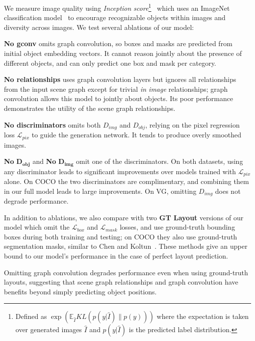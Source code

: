 \documentclass[10pt,twocolumn,letterpaper]{article}
\newcommand{\LL}{\mathcal{L}}
\begin{document}
We measure image quality using \emph{Inception score}\footnote{Defined as $\exp(\mathbb{E}_{\hat I} KL(p(y|\hat I)\|p(y)))$ where the expectation is taken over generated images $\hat I$ and $p(y|\hat I)$ is the predicted label distribution.}~\cite{salimans2016improved}
which uses an ImageNet classification model~\cite{russakovsky2015imagenet,szegedy2015going}
to encourage recognizable objects within images and diversity across images.
We test several ablations of our model:

\textbf{No gconv} omits graph convolution, so boxes and
masks are predicted from initial object embedding vectors.
It cannot reason jointly about the presence of different objects, and can only predict one box and mask per category.

\textbf{No relationships} uses graph convolution layers but ignores all
relationships from the input scene graph except for trivial \emph{in image}
relationships; graph convolution allows this model to jointly about
objects. Its poor performance demonstrates the utility of the scene graph relationships.

\textbf{No discriminators} omits both $D_{img}$ and $D_{obj}$, relying on the
pixel regression loss $\LL_{pix}$ to guide the generation network.
It tends to produce overly smoothed images.

\textbf{No} $\mathbf{D_{obj}}$ and \textbf{No} $\mathbf{D_{img}}$ omit one of
the discriminators. On both datasets, using any discriminator leads
to significant improvements over models trained with $\LL_{pix}$ alone.
On COCO the two discriminators are complimentary, and combining
them in our full model leads to large improvements.
On VG, omitting $D_{img}$ does not degrade performance.

In addition to ablations, we also compare with two \textbf{GT Layout}
versions of our model which omit the $\LL_{box}$ and $\LL_{mask}$ losses, and
use ground-truth bounding boxes during both training and testing; on COCO they
also use ground-truth segmentation masks, similar to Chen and
Koltun~\cite{chen2017photographic}. These methods give an upper bound to our
model's performance in the case of perfect layout prediction.

Omitting graph convolution degrades performance even when using ground-truth layouts, suggesting that scene graph relationships and graph convolution have benefits beyond simply predicting object positions.
\end{document}
